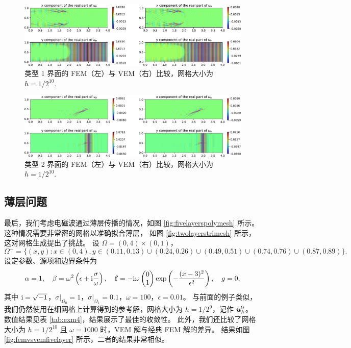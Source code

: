 \begin{figure}[!h]
\centering
\includegraphics[width=5in]{./figures/maxwell/two_circle.pdf}
\caption{类型 1 界面的 FEM（左）与 VEM（右）比较，网格大小为 $h = 1/2^{10}$.}
\label{fig:femvsvemdoublecircle}
\end{figure}

\begin{figure}[!h]
\centering
\includegraphics[width=5in]{./figures/maxwell/polypoly.pdf}
\caption{类型 2 界面的 FEM（左）与 VEM（右）比较，网格大小为 $h = 1/2^{10}$.}
\label{fig:femvsvempoly}
\end{figure}



\subsection{薄层问题}
\label{subsec:thinlayer}
最后，我们考虑电磁波通过薄层传播的情况，如图 \ref{fig:fivelayerspolymesh} 所示。
这种情况需要非常密的网格以准确拟合薄层，
如图 \ref{fig:twolayerstrimesh} 所示，这对网格生成提出了挑战。
设 $\Omega=(0, 4)\times(0, 1)$，
{\small
$$
\Omega^- =
\{(x, y) : x \in (0, 4),
y \in (0.11, 0.13)\cup(0.24, 0.26)
\cup(0.49, 0.51)\cup(0.74,
0.76)\cup(0.87, 0.89)\}.
$$
}
设定参数、源项和边界条件为
$$
\alpha = 1,\quad \beta = \omega^2\left(\epsilon + {\rm i} \frac{\sigma}{\omega}\right), \quad {\bf f} = -{\rm i}\omega\begin{pmatrix}
0\\
1
\end{pmatrix} \exp\left(-\frac{(x-3)^2}{\epsilon^2}\right),\quad g = 0,
$$
其中 ${\rm i} = \sqrt{-1}$，$\sigma|_{\Omega_0}=1$，$\sigma|_{\Omega_1}=0.1$，$\omega = 100$，$\epsilon=0.01$。
与前面的例子类似，我们仍然使用在细网格上计算得到的参考解，网格大小为 $h = 1/2^9$，记作 $\boldsymbol{u}^9_h$。
数值结果见表 \ref{tab:exm4}，结果展示了最佳的收敛性。
此外，我们还比较了网格大小为 $h = 1/2^{10}$ 且 $\omega = 1000$ 时，VEM 解与经典 FEM 解的差异。
结果如图 \ref{fig:femvsvemfivelayer} 所示，二者的结果非常相似。

